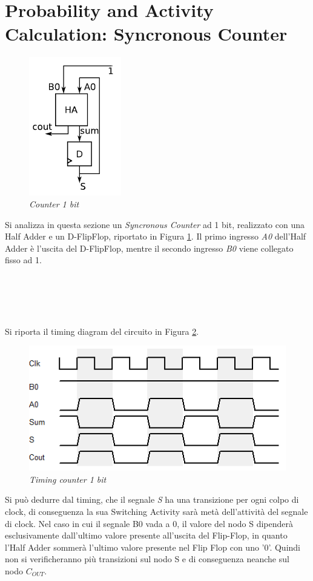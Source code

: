 \section{Probability and Activity Calculation: Syncronous Counter}
\begin{figure}[!htb]
	\centering
	\includegraphics[scale=0.6]{immagini/counter}
	\caption{\textit{Counter 1 bit}}
	\label{counter}
\end{figure}
\noindent Si analizza in questa sezione un \textit{Syncronous Counter} ad 1 bit, realizzato con una Half Adder e un D-FlipFlop, riportato in Figura \ref{counter}. Il primo ingresso \textit{A0} dell'Half Adder è l'uscita del D-FlipFlop, mentre il secondo ingresso \textit{B0} viene collegato fisso ad 1.\\
\\
\\
\\
\\
\\
Si riporta il timing diagram del circuito in Figura \ref{timing_counter1}.
\begin{figure}[!htb]
	\centering
	\includegraphics[scale=0.6]{immagini/timing_counter1}
	\caption{\textit{Timing counter 1 bit}}
	\label{timing_counter1}
\end{figure}
Si può dedurre dal timing, che il segnale \textit{S} ha una transizione per ogni colpo di clock, di conseguenza la sua Switching Activity sarà metà dell'attività del segnale di clock. Nel caso in cui il segnale B0 vada a 0, il valore del nodo S dipenderà esclusivamente dall'ultimo valore presente all'uscita del Flip-Flop, in quanto l'Half Adder sommerà l'ultimo valore presente nel Flip Flop con uno '0'. Quindi non si verificheranno più transizioni sul nodo S e di conseguenza neanche sul nodo $C_{OUT}$.
